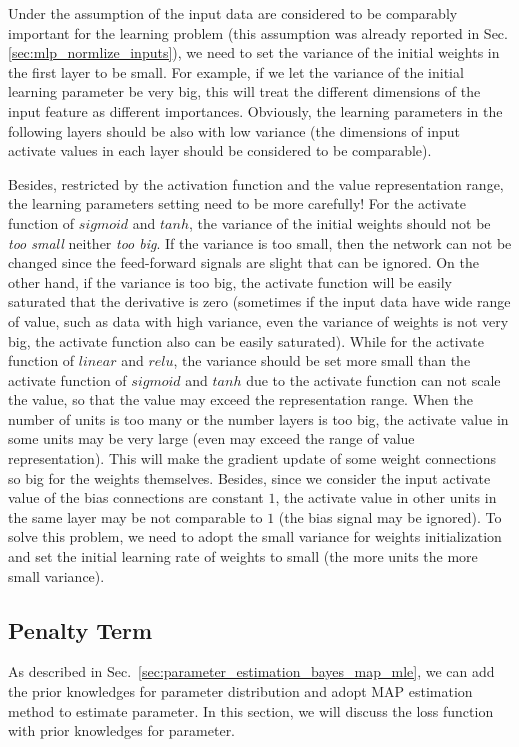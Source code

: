 \documentclass[runningheads,openany]{xhlPaper}
\begin{document}
Under the assumption of the input data are considered to be comparably important for the learning problem (this assumption was already reported in Sec.\ref{sec:mlp_normlize_inputs}),
we need to set the variance of the initial weights in the first layer to be small.
For example, if we let the variance of the initial learning parameter be very big, this will treat the different  dimensions of the input feature as different importances.
Obviously, the learning parameters in the following layers should be also with low variance (the dimensions of input activate values in each layer should be considered to be comparable).

Besides, restricted by the activation function and the value representation range, the learning parameters setting need to be more carefully! 
For the activate function of $sigmoid$ and $tanh$, the variance of the initial weights should not be \emph{too small} neither \emph{too big}.
If the variance is too small, then the network can not be changed since the feed-forward signals are slight that can be ignored.
On the other hand, if the variance is too big, the activate function will be easily saturated that the derivative is zero (sometimes if the input data have wide range of value, such as data with high variance, even the variance of weights is not very big, the activate function also can be easily saturated).
While for the activate function of $linear$ and $relu$, the variance should be set more small than the activate function of $sigmoid$ and $tanh$ due to the activate function can not scale the value, so that the value may exceed the representation range.
When the number of units is too many or the number layers is too big, the activate value in some units may be very large (even may exceed the range of value representation).
This will make the gradient update of some weight connections so big for the weights themselves.
Besides, since we consider the input activate value of the bias connections are constant $1$, the activate value in other units in the same layer may be not comparable to $1$ (the bias signal may be ignored).
To solve this problem, we need to adopt the small variance for weights initialization and set the initial learning rate of weights to small (the more units the more small variance).

\subsection{Penalty Term}
\label{sec:penalty_term}
As described in Sec.~\ref{sec:parameter_estimation_bayes_map_mle}, we can add the prior knowledges for parameter distribution and adopt MAP estimation method to estimate parameter.
In this section, we will discuss the loss function with prior knowledges for parameter.
\end{document}
